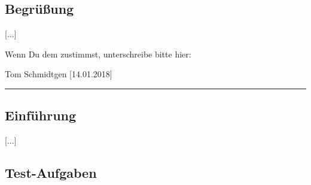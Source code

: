 \subsection*{Begrüßung}
[...]

Wenn Du dem zustimmst, unterschreibe bitte hier:

\vspace*{1em}
Tom Schmidtgen [14.01.2018]\vspace*{-.9em}\\
\noindent\rule{8cm}{0.4pt}

\subsection*{Einführung}
[...]


\subsection*{Test-Aufgaben}
